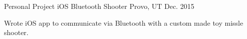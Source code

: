 \begin{cventries}
  \cventry
    {Personal Project} %
    {iOS Bluetooth Shooter} %
    {Provo, UT} %
    {Dec. 2015} %
    {
      \begin{cvitems} %
      \item {Wrote iOS app to communicate via Bluetooth with a custom made toy missle shooter.}
      \end{cvitems}
    }

\end{cventries}
